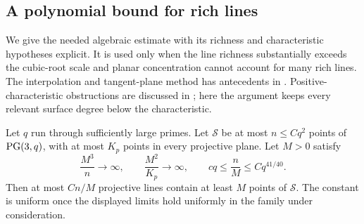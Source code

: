 \subsection{A polynomial bound for rich lines}

We give the needed algebraic estimate with its richness and
characteristic hypotheses explicit. It is used only when the line
richness substantially exceeds the cubic-root scale and planar
concentration cannot account for many rich lines. The interpolation
and tangent-plane method has antecedents in
\cite{GuthKatz2010,ElekesKaplanSharir2011}. Positive-characteristic
obstructions are discussed in \cite{EllenbergHablicsek2016}; here the
argument keeps every relevant surface degree below the characteristic.

\begin{lemma}\label{geom:rich-lines}
Let $q$ run through sufficiently large primes. Let $\mathcal S$ be
at most $n\leq Cq^2$ points of $\operatorname{PG}(3,q)$, with at most $K_p$
points in every projective plane. Let $M>0$ satisfy
\begin{equation}\label{geom:rich-regime}
 \frac{M^3}{n}\longrightarrow\infty,\qquad
 \frac{M^2}{K_p}\longrightarrow\infty,\qquad
 cq\leq\frac nM\leq Cq^{41/40}.
\end{equation}
Then at most $Cn/M$ projective lines contain at least $M$ points of
$\mathcal S$. The constant is uniform once the displayed limits hold
uniformly in the family under consideration.
\end{lemma}

